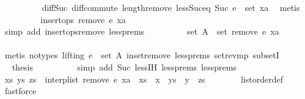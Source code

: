 \begin{isabellebody}
\ \ \ \ \ \ \ \ \isamarkupfalse%
\ diff{\isacharunderscore}Suc{\isacharunderscore}{}\ diff{\isacharunderscore}commute\ length{\isacharunderscore}remove{}\ less{\isacharunderscore}Suc{\isacharunderscore}eq\ Suc\ {\isacartoucheopen}e\ {\isasymin}\ set\ xa{\isacartoucheclose}\ \isamarkupfalse%
\ metis\isanewline
\ \ \ \ \ \ \isamarkupfalse%
\ \isamarkupfalse%
\ {\isachardoublequoteopen}insert{\isacharunderscore}ops\ {\isacharparenleft}remove{}\ e\ xa{\isacharparenright}{\isachardoublequoteclose}\isanewline
\ \ \ \ \ \ \ \ \isamarkupfalse%
\ {\isacharparenleft}simp\ add{\isacharcolon}\ insert{\isacharunderscore}ops{\isacharunderscore}remove{}\ less{\isachardot}prems{\isacharparenleft}{}{\isacharparenright}{\isacharparenright}\isanewline
\ \ \ \ \ \ \isamarkupfalse%
\ \isamarkupfalse%
\ {\isachardoublequoteopen}set\ A\ {\isasymsubseteq}\ set\ {\isacharparenleft}remove{}\ e\ xa{\isacharparenright}{\isachardoublequoteclose}\isanewline
\ \ \ \ \ \ \ \ \isamarkupfalse%
\ {\isacharparenleft}metis\ {\isacharparenleft}no{\isacharunderscore}types{\isacharcomma}\ lifting{\isacharparenright}\ {\isacartoucheopen}e\ {\isasymnotin}\ set\ A{\isacartoucheclose}\ in{\isacharunderscore}set{\isacharunderscore}remove{}\ less{\isachardot}prems{\isacharparenleft}{}{\isacharparenright}\ set{\isacharunderscore}rev{\isacharunderscore}mp\ subsetI{\isacharparenright}\isanewline
\ \ \ \ \ \ \isamarkupfalse%
\ \isamarkupfalse%
\ {\isacharquery}thesis\isanewline
\ \ \ \ \ \ \ \ \isamarkupfalse%
\ {\isacharparenleft}simp\ add{\isacharcolon}\ Suc\ less{\isachardot}IH\ less{\isachardot}prems{\isacharparenleft}{}{\isacharparenright}\ less{\isachardot}prems{\isacharparenleft}{}{\isacharparenright}{\isacharparenright}\isanewline
\ \ \ \ \isamarkupfalse%
\isanewline
\ \ \ \ \isamarkupfalse%
\ \isamarkupfalse%
\ xs\ ys\ zs\ \ {\isachardoublequoteopen}interp{\isacharunderscore}list\ {\isacharparenleft}remove{}\ e\ xa{\isacharparenright}\ {\isacharequal}\ xs\ {\isacharat}\ x\ {\isacharhash}\ ys\ {\isacharat}\ y\ {\isacharhash}\ zs{\isachardoublequoteclose}\isanewline
\ \ \ \ \ \ \isamarkupfalse%
\ list{\isacharunderscore}order{\isacharunderscore}def\ \isamarkupfalse%
\ fastforce\isanewline

\end{isabellebody}
